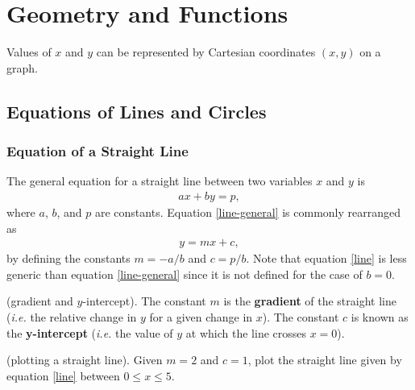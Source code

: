 \section{Geometry and Functions}

Values of $x$ and $y$ can be represented by Cartesian coordinates $(x,y)$ on a graph.

\subsection{Equations of Lines and Circles}

\subsubsection{Equation of a Straight Line}

The general equation for a straight line between two variables $x$ and $y$ is 
\begin{align}
    \label{line-general} ax + by = p,
\end{align}
where $a$, $b$, and $p$ are constants. Equation \eqref{line-general} is commonly rearranged as 
\begin{align}
    \label{line} y = mx + c,
\end{align}
by defining the constants $m = -a/b$ and $c = p/b$. Note that equation \eqref{line} is less generic than equation \eqref{line-general} since it is not defined for the case of $b=0$.\\

\begin{definition}
 (gradient and $y$-intercept). The constant $m$ is the \textbf{gradient} of the straight line (\textit{i.e.} the relative change in $y$ for a given change in $x$). The constant $c$ is known as the \textbf{y-intercept} (\textit{i.e.} the value of $y$ at which the line crosses $x=0$).
\end{definition}

\begin{example}
(plotting a straight line). Given $m = 2$ and $c = 1$, plot the straight line given by equation \eqref{line} between $0 \leq x \leq 5$.
\end{example}
\\

